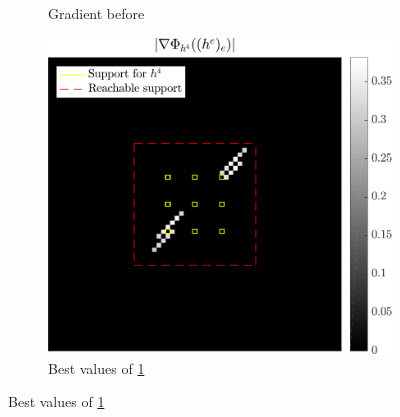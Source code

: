 \begin{figure}[!ht]
\begin{subfigure}[b]{0.34\linewidth}
\caption{Gradient before}\label{fig_beforeafter-before-grad}
\end{subfigure}
\begin{subfigure}[b]{0.34\linewidth}\centering
\includegraphics[width=\linewidth]{figures/before_after/before_partgrad4_bestvalues.pdf}
\caption{Best values of \ref{fig_beforeafter-before-grad}}\label{fig_beforeafter-before-grad_best}
\end{subfigure}


\end{figure}

